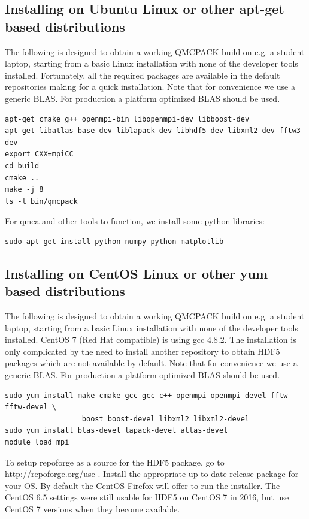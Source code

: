 \subsection{Installing on Ubuntu Linux or other apt-get based distributions}
\label{sec:buildubuntu}

The following is designed to obtain a working QMCPACK build on e.g. a
student laptop, starting from a basic Linux installation with none of
the developer tools installed. Fortunately, all the required packages
are available in the default repositories making for a quick
installation. Note that for convenience we use a generic BLAS. For
production a platform optimized BLAS should be used.

\verbatimfont{\footnotesize}
\begin{verbatim}
apt-get cmake g++ openmpi-bin libopenmpi-dev libboost-dev
apt-get libatlas-base-dev liblapack-dev libhdf5-dev libxml2-dev fftw3-dev
export CXX=mpiCC
cd build
cmake ..
make -j 8
ls -l bin/qmcpack
\end{verbatim}

For qmca and other tools to function, we install some python libraries:
\verbatimfont{\footnotesize}
\begin{verbatim}
sudo apt-get install python-numpy python-matplotlib
\end{verbatim}

\subsection{Installing on CentOS Linux or other yum based distributions}

The following is designed to obtain a working QMCPACK build on e.g. a
student laptop, starting from a basic Linux installation with none of
the developer tools installed. CentOS 7 (Red Hat compatible) is using
gcc 4.8.2. The installation is only complicated by the need to install
another repository to obtain HDF5 packages which are not available by
default. Note that for convenience we use a generic BLAS. For
production a platform optimized BLAS should be used.

\verbatimfont{\footnotesize}
\begin{verbatim}
sudo yum install make cmake gcc gcc-c++ openmpi openmpi-devel fftw fftw-devel \
                  boost boost-devel libxml2 libxml2-devel
sudo yum install blas-devel lapack-devel atlas-devel
module load mpi
\end{verbatim}

To setup repoforge as a source for the HDF5 package, go to
\url{http://repoforge.org/use} . Install the appropriate up to date
release package for your OS. By default the CentOS Firefox will offer
to run the installer. The CentOS 6.5 settings were still usable for HDF5 on
CentOS 7 in 2016, but use CentOS 7 versions when they become
available.

